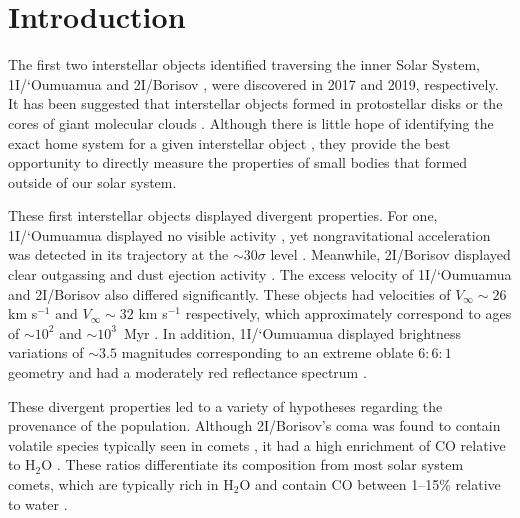 \documentclass[linenumbers,twocolumn,longbib]{aastex7}
\begin{document}
\section{Introduction}\label{sec:intro}

The first two interstellar objects identified traversing the inner Solar System, 1I/`Oumuamua \citep{Williams17} and 2I/Borisov \citep{borisov_2I_cbet}, were discovered in 2017 and 2019, respectively. It has been suggested that interstellar objects formed in protostellar disks \citep{Fitzsimmons2024} or the cores of giant molecular clouds \citep{Hsieh2021}. Although there is little hope of identifying the exact home system for a given interstellar object \citep{Hallatt2020}, they provide the best opportunity to directly measure the properties of small bodies that formed outside of our solar system.

These first interstellar objects displayed divergent properties. For one, 1I/`Oumuamua displayed no visible activity \citep{Meech2017,Ye2017,Jewitt2017,Trilling2018}, yet nongravitational acceleration was detected in its trajectory at the $\sim30\sigma$ level \citep{Micheli2018}. Meanwhile, 2I/Borisov displayed clear outgassing and dust ejection activity \citep{Jewitt2019b,Fitzsimmons:2019,Bolin2019,Ye:2019,McKay2020,Guzik:2020,Hui2020,Kim2020,Cremonese2020,yang2021}. The excess velocity of 1I/`Oumuamua and 2I/Borisov also differed significantly. These objects had velocities of $V_\infty\sim26$ km s$^{-1}$ and $V_\infty\sim32$ km s$^{-1}$ respectively, which approximately correspond to ages of $\sim10^2$ and $\sim10^3$~Myr \citep{Mamajek2017,Gaidos2017a, Feng2018,Fernandes2018,Hallatt2020,Hsieh2021}. In addition, 1I/`Oumuamua displayed brightness variations of $\sim3.5$ magnitudes corresponding to an extreme oblate $6:6:1$ geometry \citep{Meech2017,Knight2017,Bolin2017,Fraser2017,Belton2018,Mashchenko2019,Taylor2023} and had a moderately red reflectance spectrum \citep{Meech2017,Fitzsimmons2017,Ye2017}.

These divergent properties led to a variety of hypotheses regarding the provenance of the population. Although 2I/Borisov's coma was found to contain volatile species typically seen in comets \citep{Opitom:2019-borisov, Kareta:2019, lin2020,Bannister2020,Xing2020,Bagnulo2021,Aravind2021}, it had a high enrichment of CO relative to H$_2$O \citep{Bodewits2020, Cordiner2020}. These ratios differentiate its composition from most solar system comets, which are typically rich in H$_2$O and contain CO between 1--15\% relative to water \citep{2024come.book..459B}.
\end{document}
